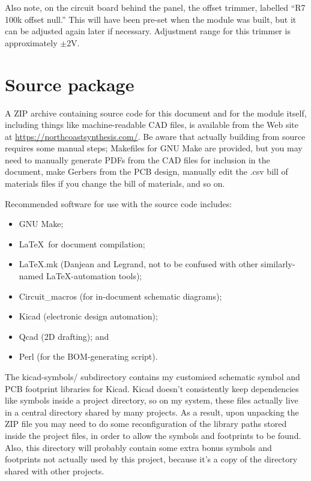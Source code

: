 Also note, on the circuit board behind the panel, the offset trimmer,
labelled ``R7 100k offset null.'' This will have been pre-set when the
module was built, but it can be adjusted again later if necessary. 
Adjustment range for this trimmer is approximately $\pm$2V.

\section{Source package}

A ZIP archive containing source code for this document and for the module
itself, including things like machine-readable CAD files, is available from 
the Web site at 
\url{https://northcoastsynthesis.com/}.  Be aware that actually building
from source requires some manual steps; Makefiles for GNU Make are provided,
but you may need to manually generate PDFs from the CAD files for inclusion
in the document, make Gerbers from the PCB design, manually edit the .csv
bill of materials files if you change the bill of materials, and so on.

Recommended software for use with the source code includes:
\begin{itemize}
  \item GNU Make;
  \item \LaTeX\ for document compilation;
  \item LaTeX.mk (Danjean and Legrand, not to be confused with other
    similarly-named \LaTeX-automation tools);
  \item Circuit\_macros (for in-document schematic diagrams);
  \item Kicad (electronic design automation);
  \item Qcad (2D drafting); and
  \item Perl (for the BOM-generating script).
\end{itemize}

The kicad-symbols/ subdirectory contains my customised schematic symbol and
PCB footprint libraries for Kicad.  Kicad doesn't consistently keep
dependencies like symbols inside a project directory, so on my system, these
files actually live in a central directory shared by many projects.  As a
result, upon unpacking the ZIP file you may need to do some reconfiguration
of the library paths stored inside the project files, in order to allow the
symbols and footprints to be found.  Also, this directory will probably
contain some extra bonus symbols and footprints not actually used by this
project, because it's a copy of the directory shared with other projects.

